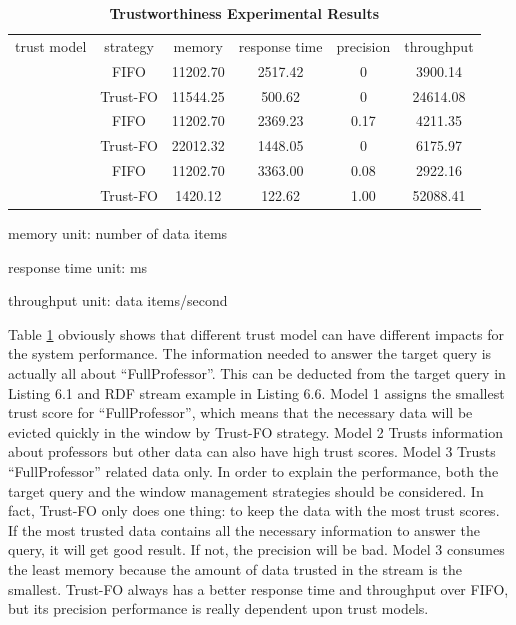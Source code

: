 \begin{table}[!htbp]
	\centering
    \caption{\textbf{Trustworthiness Experimental Results}}
    \label{tab:6-tp}
    \begin{tabular}{|c||c|c|c|c|c|} \hline
    trust model & strategy & memory & response time & precision & throughput \\ \hhline{|=#=|=|=|=|=|}
    \multirow{2}{*}{Model 1} & FIFO & 11202.70 & 2517.42 & 0 & 3900.14 \\ \cline{2-6} 
    						 & Trust-FO & 11544.25 & 500.62 & 0 & 24614.08 \\ \hhline{|=#=|=|=|=|=|}
    \multirow{2}{*}{Model 2} & FIFO & 11202.70 & 2369.23 & 0.17 & 4211.35 \\ \cline{2-6} 
    						 & Trust-FO & 22012.32 & 1448.05 & 0 & 6175.97 \\ \hhline{|=#=|=|=|=|=|}
    \multirow{2}{*}{Model 3} & FIFO & 11202.70 & 3363.00 & 0.08 & 2922.16 \\ \cline{2-6} 
    						 & Trust-FO & 1420.12 & 122.62 & 1.00 & 52088.41\\ \hline 
    \end{tabular}
    \begin{tablenotes}
 		\item memory unit: number of data items
 		\item response time unit: ms
 		\item throughput unit: data items/second
    \end{tablenotes}
\end{table}

Table \ref{tab:6-tp} obviously shows that different trust model can have different impacts for the system performance. 
The information needed to answer the target query is actually all about ``FullProfessor''.
This can be deducted from the target query in Listing 6.1 and RDF stream example in Listing 6.6.
Model 1 assigns the smallest trust score for ``FullProfessor'', which means that the necessary data will be evicted quickly in the window by Trust-FO strategy. 
Model 2 Trusts information about professors but other data can also have high trust scores.
Model 3 Trusts ``FullProfessor'' related data only.
In order to explain the performance, both the target query and the window management strategies should be considered. 
In fact, Trust-FO only does one thing: to keep the data with the most trust scores.
If the most trusted data contains all the necessary information to answer the query, it will get good result. 
If not, the precision will be bad. 
Model 3 consumes the least memory because the amount of data trusted in the stream is the smallest. 
Trust-FO always has a better response time and throughput over FIFO, but its precision performance is really dependent upon trust models. 
%
